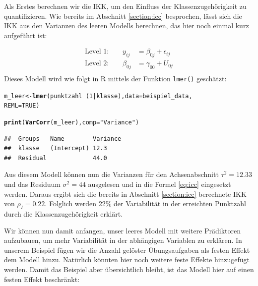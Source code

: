 \documentclass[12pt]{article}\usepackage[]{graphicx}\usepackage[]{color}
\makeatletter
\newcommand{\hlnum}[1]{\textcolor[rgb]{0.686,0.059,0.569}{#1}}%
\newcommand{\hlstr}[1]{\textcolor[rgb]{0.192,0.494,0.8}{#1}}%
\newcommand{\hlopt}[1]{\textcolor[rgb]{0,0,0}{#1}}%
\newcommand{\hlstd}[1]{\textcolor[rgb]{0.345,0.345,0.345}{#1}}%
\newcommand{\hlkwb}[1]{\textcolor[rgb]{0.69,0.353,0.396}{#1}}%
\newcommand{\hlkwc}[1]{\textcolor[rgb]{0.333,0.667,0.333}{#1}}%
\newcommand{\hlkwd}[1]{\textcolor[rgb]{0.737,0.353,0.396}{\textbf{#1}}}%
\newenvironment{kframe}{%
 \def\at@end@of@kframe{}%
 \ifinner\ifhmode%
  \def\at@end@of@kframe{\end{minipage}}%
  \begin{minipage}{\columnwidth}%
 \fi\fi%
 \def\FrameCommand##1{\hskip\@totalleftmargin \hskip-\fboxsep
 \colorbox{shadecolor}{##1}\hskip-\fboxsep
     \hskip-\linewidth \hskip-\@totalleftmargin \hskip\columnwidth}%
 \MakeFramed {\advance\hsize-\width
   \@totalleftmargin\z@ \linewidth\hsize
   \@setminipage}}%
 {\par\unskip\endMakeFramed%
 \at@end@of@kframe}
\newenvironment{knitrout}{}{} %
\makeatother
\begin{document}
Als Erstes berechnen wir die IKK, um den Einfluss der Klassenzugehörigkeit zu quantifizieren. Wie bereits im Abschnitt \ref{section:icc} besprochen, lässt sich die IKK aus den Varianzen des leeren Modells berechnen, das hier noch einmal kurz aufgeführt ist:

\begin{equation}
\begin{split}	
 \text{Level 1:}  \qquad y_{ij} & = \beta_{0j} + \epsilon_{ij}\\
 \text{Level 2:} \qquad \beta_{0j} & = \gamma_{00} + U_{0j}\\
\end{split}	
\end{equation} 
Dieses Modell wird wie folgt in R mittels der Funktion \texttt{lmer()} geschätzt:

\singlespacing
\begin{knitrout}
\color{fgcolor}\begin{kframe}
\begin{alltt}
\hlstd{m_leer} \hlkwb{<-} \hlkwd{lmer}\hlstd{(punktzahl} \hlopt{~} \hlstd{(}\hlnum{1} \hlopt{|} \hlstd{klasse),} \hlkwc{data} \hlstd{= beispiel_data,}
    \hlkwc{REML} \hlstd{=} \hlnum{TRUE}\hlstd{)}

\hlkwd{print}\hlstd{(}\hlkwd{VarCorr}\hlstd{(m_leer),} \hlkwc{comp} \hlstd{=} \hlstr{"Variance"}\hlstd{)}
\end{alltt}
\begin{verbatim}
##  Groups   Name        Variance
##  klasse   (Intercept) 12.3    
##  Residual             44.0
\end{verbatim}
\end{kframe}
\end{knitrout}

Aus diesem Modell können nun die Varianzen für den Achsenabschnitt $\tau^2 = 12.33$ und das Residuum $\sigma^2 = 44$ ausgelesen und in die Formel \eqref{eq:icc} eingesetzt werden. Daraus ergibt sich die bereits in Abschnitt \ref{section:icc} berechnete IKK von $\rho_I = 0.22$. Folglich werden 22\% der Variabilität in der erreichten Punktzahl durch die Klassenzugehörigkeit erklärt.

Wir können nun damit anfangen, unser leeres Modell mit weitere Prädiktoren aufzubauen, um mehr Variabilität in der abhängigen Variablen zu erklären. In unserem Beispiel fügen wir die Anzahl gelöster Übungsaufgaben als festen Effekt dem Modell hinzu. Natürlich könnten hier noch weitere feste Effekte hinzugefügt werden. Damit das Beispiel aber übersichtlich bleibt, ist das Modell hier auf einen festen Effekt beschränkt:
\end{document}
